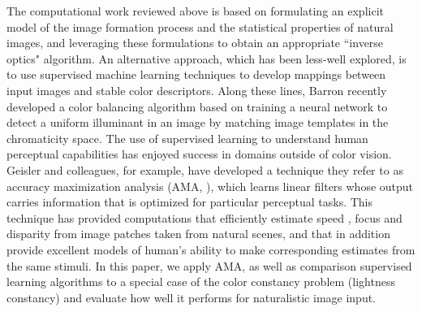 \documentclass{jov}
\begin{document}
The computational work reviewed above is based on formulating an explicit model of the image formation process and the statistical properties of natural images, and leveraging these formulations to obtain an appropriate ``inverse optics" algorithm.  An alternative approach, which has been less-well explored, is to use supervised machine learning techniques to develop mappings between input images and stable color descriptors.  Along these lines, Barron \cite{barron2015convolutional} recently developed a color balancing algorithm based on training a neural network to detect a uniform illuminant in an image by matching image templates in the chromaticity space. The use of supervised learning to understand human perceptual capabilities has enjoyed success in domains outside of color vision. Geisler and colleagues, for example, have developed a technique they refer to as accuracy maximization analysis (AMA, ), which learns linear filters whose output carries information that is optimized for particular perceptual tasks. This technique has provided computations that efficiently estimate speed \cite{burge2015optimal}, focus \cite{burge2011optimal} and disparity \cite{burge2014optimal} from image patches taken from natural scenes, and that in addition provide excellent models of human's ability to make corresponding estimates from the same stimuli.  In this paper, we apply AMA, as well as comparison supervised learning algorithms to a special case of the color constancy problem (lightness constancy) and evaluate how well it performs for naturalistic image input. 
\end{document}
